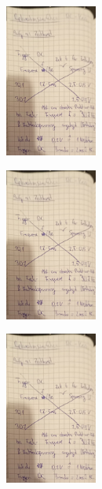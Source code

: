 \begin{minipage}[t]{0.4\textwidth}
    \includegraphics[height=5cm, page=5]{Inhalte/E01_RC-Relax-scan.pdf}
\end{minipage}

\begin{minipage}[t]{0.4\textwidth}
    \includegraphics[height=5cm, page=6]{Inhalte/E01_RC-Relax-scan.pdf}
\end{minipage}
\begin{minipage}[t]{0.4\textwidth}
    \includegraphics[height=5cm, page=7]{Inhalte/E01_RC-Relax-scan.pdf}
\end{minipage}
%
%
%
